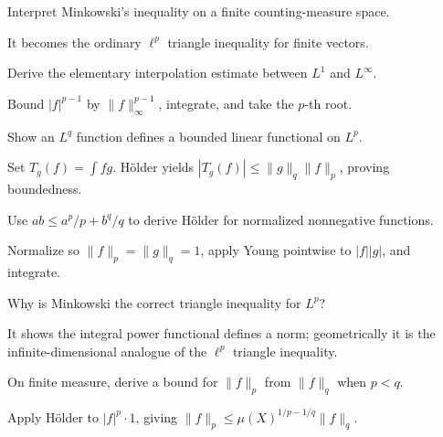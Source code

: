 \begin{problem}\label{prob:iii07-problem-02}
Interpret Minkowski's inequality on a finite counting-measure space.
\end{problem}
\begin{solution}
It becomes the ordinary \(\ell^p\) triangle inequality for finite vectors.
\end{solution}

\begin{problem}\label{prob:iii07-problem-03}
Derive the elementary interpolation estimate between \(L^1\) and \(L^\infty\).
\end{problem}
\begin{solution}
Bound \(|f|^{p-1}\) by \(\|f\|_\infty^{p-1}\), integrate, and take the
\(p\)-th root.
\end{solution}

\begin{problem}\label{prob:iii07-problem-04}
Show an \(L^q\) function defines a bounded linear functional on \(L^p\).
\end{problem}
\begin{solution}
Set \(T_g(f)=\int fg\). Hölder yields
\(|T_g(f)|\le\|g\|_q\|f\|_p\), proving boundedness.
\end{solution}

\begin{problem}\label{prob:iii07-problem-05}
Use \(ab\le a^p/p+b^q/q\) to derive Hölder for normalized nonnegative functions.
\end{problem}
\begin{solution}
Normalize so \(\|f\|_p=\|g\|_q=1\), apply Young pointwise to
\(|f||g|\), and integrate.
\end{solution}

\begin{problem}\label{prob:iii07-problem-06}
Why is Minkowski the correct triangle inequality for \(L^p\)?
\end{problem}
\begin{solution}
It shows the integral power functional defines a norm; geometrically it is
the infinite-dimensional analogue of the \(\ell^p\) triangle inequality.
\end{solution}

\begin{problem}\label{prob:iii07-problem-07}
On finite measure, derive a bound for \(\|f\|_p\) from \(\|f\|_q\) when \(p<q\).
\end{problem}
\begin{solution}
Apply Hölder to \(|f|^p\cdot1\), giving
\(\|f\|_p\le\mu(X)^{1/p-1/q}\|f\|_q\).
\end{solution}

